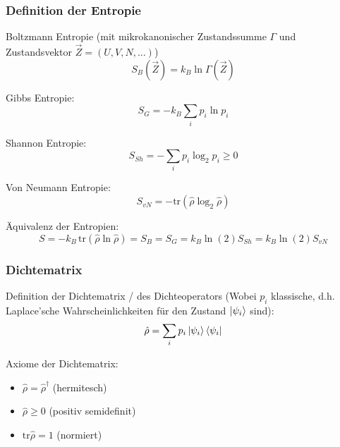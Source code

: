 \documentclass[11pt]{article}
\numberwithin{equation}{section}
\begin{document}
			\subsubsection{Definition der Entropie}
				\noindent
				Boltzmann Entropie (mit mikrokanonischer Zustandssumme $\Gamma$ und Zustandsvektor $\vec{Z}=(U,V,N,...)$)
				\begin{equation}
					S_{B}(\vec{Z}) = k_B \ln\Gamma(\vec{Z})
				\end{equation}

				\noindent
				Gibbs Entropie:
				\begin{equation}
					S_{G} = -k_B \sum_i p_i \ln p_i
				\end{equation}

				\noindent
				Shannon Entropie:
				\begin{equation}
					S_{Sh} = -\sum_i p_i\log_2{p_i} \ge 0
				\end{equation}

				\noindent
				Von Neumann Entropie:
				\begin{equation}
					S_{vN} = -\mathrm{tr}(\hat{\rho}\log_2\hat{\rho})
				\end{equation}

				\noindent
				Äquivalenz der Entropien:
				\begin{equation}
					S = -k_B\,\mathrm{tr}(\hat{\rho} \ln \hat{\rho}) = S_B = S_G = k_B\ln(2) S_{Sh} = k_B\ln(2) S_{vN}
				\end{equation}

			\subsubsection{Dichtematrix}
				\noindent
				Definition der Dichtematrix / des Dichteoperators (Wobei $p_i$ klassische, d.h. Laplace'sche Wahrscheinlichkeiten für den Zustand $\Ket{\psi_i}$ sind):
				\begin{equation}
					\hat{\rho} = \sum_i p_i \Ket{\psi_i}\Bra{\psi_i}
				\end{equation}

				\noindent
				Axiome der Dichtematrix:
				\begin{itemize}\itemsep -0pt	%
					\item $\hat{\rho} = \hat{\rho}^\dagger$ \hfill{(hermitesch)}
					\item $\hat{\rho} \ge 0 $ \hfill{(positiv semidefinit)}
					\item $\mathrm{tr} \hat{\rho} = 1$ \hfill{(normiert)}
				\end{itemize}
\end{document}

